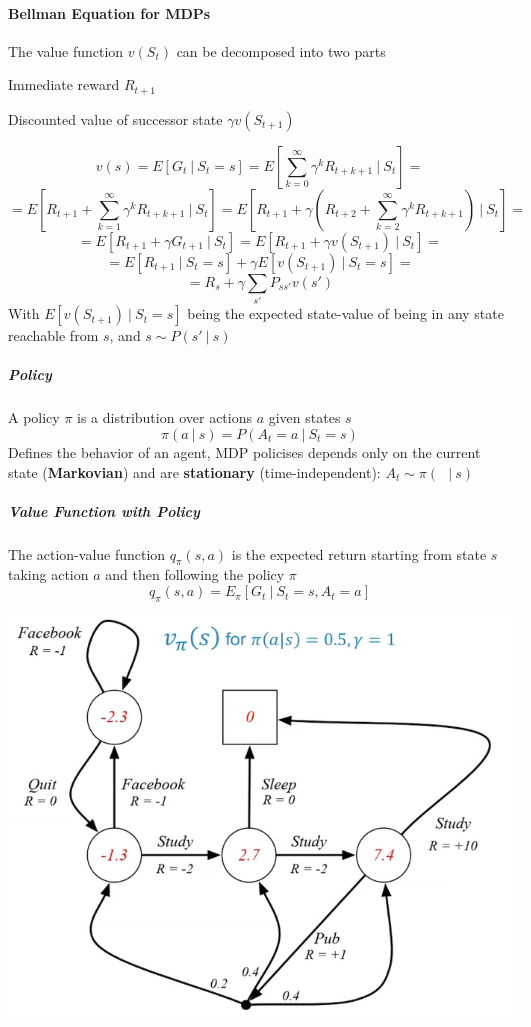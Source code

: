\documentclass[10pt]{report}
\begin{document}
\paragraph{Bellman Equation for MDPs} The value function $v(S_t)$ can be decomposed into two parts
\begin{list}{}{}
	\item Immediate reward $R_{t+1}$
	\item Discounted value of successor state $\gamma v(S_{t+1})$
\end{list}
$$v(s)=E[G_t\:|\:S_t=s] = E\left[\sum_{k=0}^\infty\gamma^kR_{t+k+1}\:|\:S_t\right]=$$
$$= E\left[R_{t+1}+\sum_{k=1}^\infty\gamma^k R_{t+k+1}\:|\:S_t\right]= E\left[R_{t+1}+\gamma\left(R_{t+2}+\sum_{k=2}^\infty\gamma^k R_{t+k+1}\right)\:|\:S_t\right]=$$
$$= E[R_{t+1}+\gamma G_{t+1}\:|\:S_t] = E[R_{t+1}+\gamma v(S_{t+1})\:|\:S_t] =$$
$$= E[R_{t+1}\:|\:S_t=s] + \gamma E[v(S_{t+1})\:|\:S_t=s]=$$
$$=R_s+\gamma\sum_{s'}P_{ss'}v(s')$$
With $E[v(S_{t+1})\:|\:S_t=s]$ being the expected state-value of being in any state reachable from $s$, and $s\sim P(s'\:|\:s)$
\subparagraph{Policy} A policy $\pi$ is a distribution over actions $a$ given states $s$ $$\pi(a\:|\:s) = P(A_t=a\:|\: S_t=s)$$
Defines the behavior of an agent, MDP policises depends only on the current state (\textbf{Markovian}) and are \textbf{stationary} (time-independent): $A_t\sim \pi(\:\:\:|\:s)$ %
\subparagraph{Value Function with Policy} The action-value function $q_\pi(s,a)$ is the expected return starting from state $s$ taking action $a$ and then following the policy $\pi$
$$q_\pi(s,a) = E_\pi[G_t\:|\:S_t=s, A_t=a]$$
\begin{center}
	\includegraphics[scale=0.5]{161.png}
\end{center}
\end{document}
